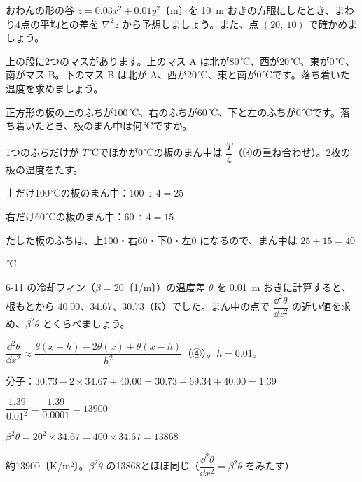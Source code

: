 \begingroup{}%
\noindent\begin{minipage}[t]{0.49\linewidth}
\begin{jibun}
\raggedright おわんの形の谷 $z=0.03x^2+0.01y^2$〔m〕を \qty{10}{m} おきの方眼にしたとき、まわり4点の平均との差を $\nabla^2z$ から予想しましょう。また、点 $(20,\ 10)$ で確かめましょう。
\end{jibun}
\end{minipage}\hfill
\begin{minipage}[t]{0.49\linewidth}
\begin{jibun}
\raggedright 上の段に2つのマスがあります。上のマス A は北が80\,℃、西が20\,℃、東が0\,℃、南がマス B。下のマス B は北が A、西が20\,℃、東と南が0\,℃です。落ち着いた温度を求めましょう。
\end{jibun}
\end{minipage}\par
\endgroup

\begin{reidai}[板のまん中の温度]
正方形の板の上のふちが100\,℃、右のふちが60\,℃、下と左のふちが0\,℃です。落ち着いたとき、板のまん中は何\,℃ですか。\par
\kangaekata 1つのふちだけが $T$\,℃でほかが0\,℃の板のまん中は $\dfrac{T}{4}$（③の重ね合わせ）。2枚の板の温度をたす。\par
\shiki 上だけ100\,℃の板のまん中：$100\div4=25$\par
\kviiimq 右だけ60\,℃の板のまん中：$60\div4=15$\par
\kviiimq たした板のふちは、上100・右60・下0・左0 になるので、まん中は $25+15=40$\par
{}\,℃
\end{reidai}

\begin{reidai}
6-11 の冷却フィン（$\beta=20$〔1/m〕）の温度差 $\theta$ を \qty{0.01}{m} おきに計算すると、根もとから 40.00、34.67、30.73（K）でした。まん中の点で $\dfrac{\dd^2\theta}{\dd x^2}$ の近い値を求め、$\beta^2\theta$ とくらべましょう。\par
\kangaekata $\dfrac{\dd^2\theta}{\dd x^2}\approx\dfrac{\theta(x+h)-2\theta(x)+\theta(x-h)}{h^2}$（④）。$h=0.01$。\par
\shiki 分子：$30.73-2\times34.67+40.00=30.73-69.34+40.00=1.39$\par
\kviiimq $\dfrac{1.39}{0.01^2}=\dfrac{1.39}{0.0001}=13900$\par
\kviiimq $\beta^2\theta=20^2\times34.67=400\times34.67=13868$\par
\kotae 約13900〔K/m²〕。$\beta^2\theta$ の13868とほぼ同じ（$\dfrac{\dd^2\theta}{\dd x^2}=\beta^2\theta$ をみたす）
\end{reidai}

